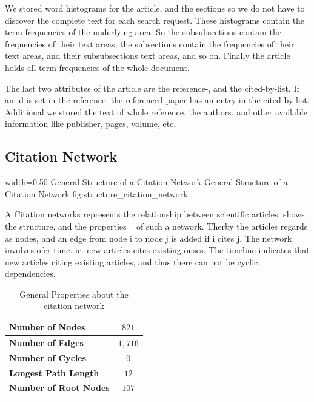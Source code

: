 We stored word histograms for the article, and the sections so we do not have to discover the complete text for each search request. These histograms contain the term frequencies of the underlying area. So the subsubsections contain the frequencies of their text areas, the subsections contain the frequencies of their text areas, and their subsubsections text areas, and so on. Finally the article holds all term frequencies of the whole document.

The last two attributes of the article are the reference-, and the cited-by-list. If an id is set in the reference, the referenced paper has an entry in the cited-by-list. Additional we stored the text of whole reference, the authors, and other available information like publisher, pages, volume, etc.

\subsection{Citation Network}
\label{sec:citation_network}

      {width=0.50\textwidth}
      {General Structure of a Citation Network}
      {General Structure of a Citation Network}
      {fig:structure_citation_network}

A Citation networks represents the relationship between scientific articles.  shows the structure, and the properties ~\cite{kas2011} of such a network. Therby the articles regards as nodes, and an edge from node i to node j is added if i cites j. The network involves ofer time. ie. new articles cites existing onses. The timeline indicates that new articles citing existing articles, and thus there can not be cyclic dependencies.

\begin{table}[!b]
  \centering
  \begin{tabular}{ l c }
    \toprule
    \textbf{Number of Nodes}      & $821$  \\ \midrule
    \textbf{Number of Edges}      & $1,716$ \\ \midrule
    \textbf{Number of Cycles}     & $0$    \\ \midrule
    \textbf{Longest Path Length}  & $12$   \\ \midrule
    \textbf{Number of Root Nodes} & $107$  \\
    \bottomrule
  \end{tabular}
  \caption[General Properties about the citation network]{General Properties about the citation network}
  \label{tbl:general_properties_about_the_graph}
\end{table}

